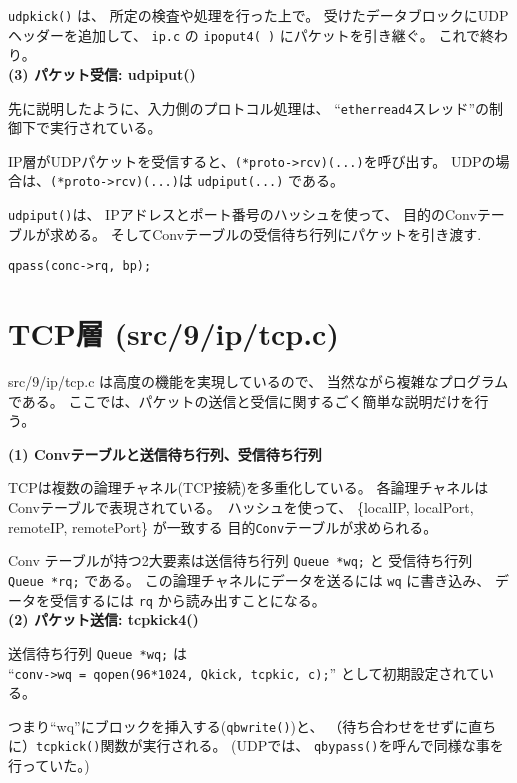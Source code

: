 \verb|udpkick()| は、
所定の検査や処理を行った上で。
受けたデータブロックにUDP ヘッダーを追加して、
{\tt ip.c} の \verb|ipoput4( )| にパケットを引き継ぐ。
これで終わり。
\\


{\bf \flushleft(3) パケット受信: udpiput()}

先に説明したように、入力側のプロトコル処理は、
``{\tt etherread4}スレッド''の制御下で実行されている。

IP層がUDPパケットを受信すると、\verb|(*proto->rcv)(...)|を呼び出す。
UDPの場合は、\verb|(*proto->rcv)(...)|は \verb|udpiput(...)| である。



\verb|udpiput()|は、
IPアドレスとポート番号のハッシュを使って、
目的のConvテーブルが求める。
そしてConvテーブルの受信待ち行列にパケットを引き渡す.

   \verb|qpass(conc->rq, bp);|
\\


    
\section{ TCP層   (src/9/ip/tcp.c)}


src/9/ip/tcp.c は高度の機能を実現しているので、
当然ながら複雑なプログラムである。
ここでは、パケットの送信と受信に関するごく簡単な説明だけを行う。


{\bf \flushleft(1) Convテーブルと送信待ち行列、受信待ち行列}

TCPは複数の論理チャネル(TCP接続)を多重化している。
各論理チャネルは Convテーブルで表現されている。\
ハッシュを使って、
\{localIP, localPort, remoteIP, remotePort\} が一致する
目的{\tt Conv}テーブルが求められる。

Conv テーブルが持つ2大要素は送信待ち行列 \verb|Queue *wq;| と
受信待ち行列 \verb|Queue *rq;| である。
この論理チャネルにデータを送るには {\tt wq} に書き込み、
データを受信するには {\tt rq} から読み出すことになる。
\\

{\bf \flushleft(2) パケット送信: tcpkick4()}

送信待ち行列 \verb|Queue *wq;| は \\
``\verb|conv->wq = qopen(96*1024, Qkick, tcpkic, c);|''
として初期設定されている。

つまり``wq''にブロックを挿入する(\verb|qbwrite()|)と、
（待ち合わせをせずに直ちに）\verb|tcpkick()|関数が実行される。
(UDPでは、 \verb|qbypass()|を呼んで同様な事を行っていた。)

